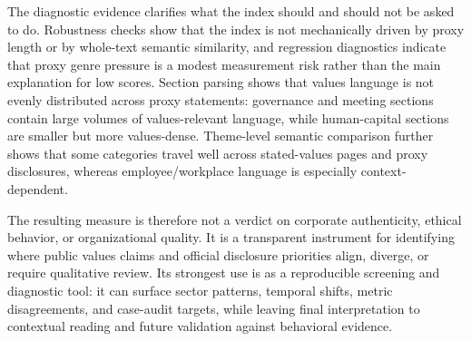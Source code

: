 \documentclass[11pt]{article}
\begin{document}
The diagnostic evidence clarifies what the index should and should not be asked to do. Robustness
checks show that the index is not mechanically driven by proxy length or by whole-text semantic
similarity, and regression diagnostics indicate that proxy genre pressure is a modest measurement
risk rather than the main explanation for low scores. Section parsing shows that values language is
not evenly distributed across proxy statements: governance and meeting sections contain large
volumes of values-relevant language, while human-capital sections are smaller but more values-dense.
Theme-level semantic comparison further shows that some categories travel well across stated-values
pages and proxy disclosures, whereas employee/workplace language is especially context-dependent.

The resulting measure is therefore not a verdict on corporate authenticity, ethical behavior, or
organizational quality. It is a transparent instrument for identifying where public values claims and
official disclosure priorities align, diverge, or require qualitative review. Its strongest use is as
a reproducible screening and diagnostic tool: it can surface sector patterns, temporal shifts,
metric disagreements, and case-audit targets, while leaving final interpretation to contextual
reading and future validation against behavioral evidence.
\end{document}

